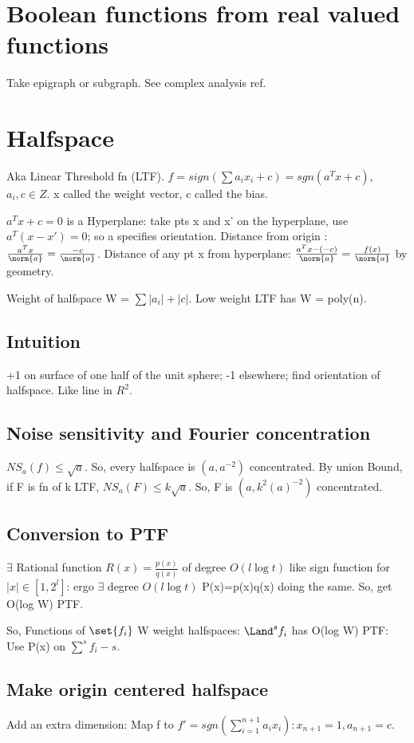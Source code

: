 \documentclass[oneside, article]{memoir}
\begin{document}
\section{Boolean functions from real valued functions}
Take epigraph or subgraph. See complex analysis ref.

\section{Halfspace}
Aka Linear Threshold fn (LTF). $f=sign(\sum a_{i}x_{i} + c) = sgn(a^{T}x + c)$, $a_{i}, c \in Z$. x called the weight vector, c called the bias.

$a^{T}x + c = 0$ is a Hyperplane: take pts x and x' on the hyperplane, use $a^{T}(x-x') = 0$; so a specifies orientation. Distance from origin : $\frac{a^{T}x}{\norm{a}} = \frac{-c}{\norm{a}}$. Distance of any pt x from hyperplane: $\frac{a^{T}x - (-c)}{\norm{a}} = \frac{f(x)}{\norm{a}}$ by geometry.

Weight of halfspace W = $\sum |a_{i}| + |c|$. Low weight LTF has W = poly(n).

\subsection{Intuition}
+1 on surface of one half of the unit sphere; -1 elsewhere; find orientation of halfspace. Like line in $R^{2}$.

\subsection{Noise sensitivity and Fourier concentration}
$NS_{a}(f) \leq \sqrt{a}$. \why So, every halfspace is $(a,a^{-2})$ concentrated. By union Bound, if F is fn of k LTF, $NS_{a}(F) \leq k \sqrt{a}$. So, F is $(a,k^{2}(a)^{-2})$ concentrated.

\subsection{Conversion to PTF}
$\exists$ Rational function $R(x) = \frac{p(x)}{q(x)}$ of degree $O(l\log t)$ like sign function for $|x| \in [1,2^{l}]$: ergo $\exists$ degree $O(l\log t)$ P(x)=p(x)q(x) doing the same. So, get O(log W) PTF.

So, Functions of $\set{f_{i}}$ W weight halfspaces: $\Land^{s} f_{i}$ has O(log W) PTF: Use P(x) on $\sum^{s} f_{i} - s$.

\subsection{Make origin centered halfspace}
Add an extra dimension: Map f to $f' = sgn(\sum_{i=1}^{n+1} a_{i}x_{i}): x_{n+1} = 1, a_{n+1} = c$.
\end{document}
